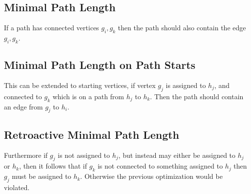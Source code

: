 \documentclass[11pt,twocolumn]{article}
\begin{document}
\subsection{Minimal Path Length}
If a path has connected vertices $g_i, g_k$ then the path should also contain the edge $g_i, g_k$.

\subsection{Minimal Path Length on Path Starts}
This can be extended to starting vertices, if vertex $g_j$ is assigned to $h_j$,
  and connected to $g_k$ which is on a path from $h_j$ to $h_k$.
Then the path should contain an edge from $g_j$ to $h_i$.

\subsection{Retroactive Minimal Path Length}
Furthermore if $g_j$ is not assigned to $h_j$, but instead may either be assigned to $h_j$ or $h_k$,
  then it follows that if $g_k$ is not connected to something assigned to $h_j$ then $g_j$ must be assigned to $h_k$.
Otherwise the previous optimization would be violated.
\end{document}
